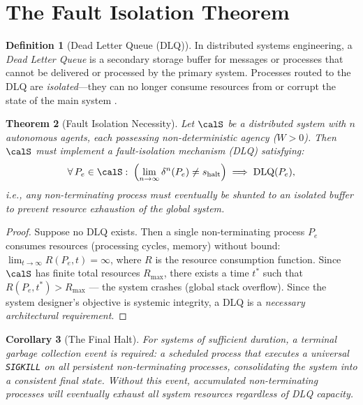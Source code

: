 \documentclass[12pt, a4paper]{article}
\theoremstyle{plain}
\newtheorem{theorem}{Theorem}[section]
\newtheorem{corollary}[theorem]{Corollary}
\theoremstyle{definition}
\newtheorem{definition}[theorem]{Definition}
\begin{document}
\section{The Fault Isolation Theorem}\label{sec:fault}

\begin{definition}[Dead Letter Queue (DLQ)]\label{def:dlq}
  In distributed systems engineering, a \emph{Dead Letter Queue} is a
  secondary storage buffer for messages or processes that cannot be
  delivered or processed by the primary system. Processes routed to the
  DLQ are \emph{isolated}---they can no longer consume resources from
  or corrupt the state of the main system \citep{Tanenbaum2014}.
\end{definition}

\begin{theorem}[Fault Isolation Necessity]\label{thm:fault}
  Let $\calS$ be a distributed system with $n$ autonomous agents, each
  possessing non-deterministic agency ($W > 0$). Then $\calS$ must
  implement a fault-isolation mechanism (DLQ) satisfying:
  \begin{equation}\label{eq:fault}
    \forall\, P_e \in \calS : \;
    \left(\lim_{n \to \infty} \delta^n(P_e) \neq s_{\text{halt}}\right)
    \implies \text{DLQ}(P_e),
  \end{equation}
  i.e., any non-terminating process must eventually be shunted to an
  isolated buffer to prevent resource exhaustion of the global system.
\end{theorem}

\begin{proof}
  Suppose no DLQ exists. Then a single non-terminating process $P_e$
  consumes resources (processing cycles, memory) without bound:
  $\lim_{t \to \infty} R(P_e, t) = \infty$, where $R$ is the resource
  consumption function. Since $\calS$ has finite total resources $R_{\max}$,
  there exists a time $t^*$ such that $R(P_e, t^*) > R_{\max}$ ---
  the system crashes (global stack overflow). Since the system designer's
  objective is systemic integrity, a DLQ is a \emph{necessary architectural
  requirement}. \qedhere
\end{proof}

\begin{corollary}[The Final Halt]\label{cor:gc}
  For systems of sufficient duration, a terminal \emph{garbage collection}
  event is required: a scheduled process that executes a universal
  \texttt{SIGKILL} on all persistent non-terminating processes,
  consolidating the system into a consistent final state. Without this
  event, accumulated non-terminating processes will eventually exhaust
  all system resources regardless of DLQ capacity.
\end{corollary}
\end{document}
